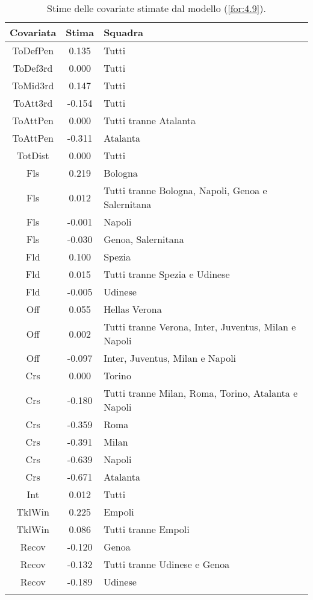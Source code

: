 \begin{table}[!htbp]%
	
	\renewcommand{\arraystretch}{1.7}
	\centering
	\begin{tabular}{ccp{10cm}}
		\hline			
		\textbf{Covariata} & \textbf{Stima} & \textbf{Squadra} \\	
		\hline
		ToDefPen & 0.135 & Tutti \\      
		ToDef3rd & 0.000 & Tutti \\
		ToMid3rd & 0.147 &Tutti\\
		ToAtt3rd & -0.154 & Tutti \\  
		ToAttPen & 0.000 & Tutti tranne Atalanta \\    
		ToAttPen & -0.311 & Atalanta \\ 	     	 
		TotDist & 0.000 & Tutti \\	
		Fls & 0.219 & Bologna  \\
		Fls & 0.012 & Tutti tranne Bologna, Napoli, Genoa e Salernitana  \\ 		
		Fls & -0.001 & Napoli  \\
		Fls & -0.030 & Genoa, Salernitana  \\
		Fld & 0.100 & Spezia \\
		Fld & 0.015 & Tutti tranne Spezia e Udinese  \\
		Fld & -0.005 & Udinese \\
		Off & 0.055 & Hellas Verona\\
		Off & 0.002 & Tutti tranne Verona, Inter, Juventus, Milan e Napoli\\
		Off & -0.097 & Inter, Juventus, Milan e Napoli  \\
		Crs & 0.000 & Torino\\
		Crs & -0.180 & Tutti tranne Milan, Roma, Torino, Atalanta e Napoli\\
		Crs & -0.359 & Roma\\
		Crs & -0.391 & Milan \\
		Crs & -0.639 & Napoli\\
		Crs & -0.671 & Atalanta \\
		Int & 0.012 & Tutti\\
		TklWin &  0.225 & Empoli  \\
		TklWin &  0.086 & Tutti tranne Empoli  \\ 
		Recov &  -0.120& Genoa \\ 
		Recov &  -0.132& Tutti tranne Udinese e Genoa \\ 
		Recov &  -0.189& Udinese \\ 
		\hline
		& &  \\
		
	\end{tabular} \hbox{}
	\caption{Stime delle covariate stimate dal modello (\ref{for:4.9}).} \label{tab:BTCL3} 
\end{table}
 
